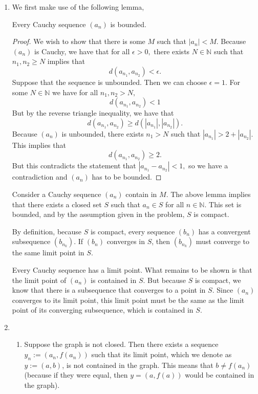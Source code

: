 \documentclass{article}
\numberwithin{equation}{section}
\begin{document}
\begin{enumerate}
\begin{enumerate}[label=(\alph*)]
    \end{enumerate}
    \newpage
    \item We first make use of the following lemma, 
    \begin{lemma}
        Every Cauchy sequence $(a_n)$ is bounded.
        \begin{proof}
            We wish to show that there is some $M$ such that $|a_n|<M.$ Because $(a_n)$ is Cauchy, we have that for all $\epsilon >0,$ there exists $N\in \mathbb{N}$ such that $n_1,n_2 \ge N$ implies that 
            \begin{equation}
                d(a_{n_1},a_{n_2}) <\epsilon.
            \end{equation}
            Suppose that the sequence is unbounded. Then we can choose $\epsilon = 1.$ For some $N \in \mathbb{N}$ we have for all $n_1,n_2 > N,$
            \begin{equation}
                d(a_{n_1},a_{n_2}) < 1
            \end{equation}
            But by the reverse triangle inequality, we have that 
            \begin{equation}
                d(a_{n_1},a_{n_2}) \ge d(|a_{n_1}|,|a_{n_2}|).
            \end{equation}
            Because $(a_n)$ is unbounded, there exists $n_1 > N$ such that $|a_{n_1}| > 2 + |a_{n_2}|.$ This implies that 
            \begin{equation}
                d(a_{n_1}, a_{n_2}) \ge 2.
            \end{equation}
            But this contradicts the statement that $|a_{n_1} - a_{n_2}| < 1,$ so we have a contradiction and $(a_n)$ has to be bounded.
        \end{proof}
    \end{lemma}
    Consider a Cauchy sequence $(a_n)$ contain in $M.$ The above lemma implies that there exists a closed set $S$ such that $a_n \in S$ for all $n \in \mathbb{N}.$ This set is bounded, and by the assumption given in the problem, $S$ is compact.

    By definition, because $S$ is compact, every sequence $(b_n)$ has a convergent subsequence $(b_{n_k})$. If $(b_n)$ converges in  $S$, then $(b_{n_k})$ must converge to the same limit point in $S$.

    Every Cauchy sequence has a limit point. What remains to be shown is that the limit point of $(a_n)$ is contained in $S.$ But because $S$ is compact, we know that there is a subsequence that converges to a point in $S.$ Since $(a_n)$ converges to its limit point, this limit point must be the same as the limit point of its converging subsequence, which is contained in $S.$
    \newpage
    \item \begin{enumerate}[label=(\alph*)]
        \item Suppose the graph is not closed. Then there exists a sequence $y_n := (a_n, f(a_n))$ such that its limit point, which we denote as $y := (a,b)$, is not contained in the graph. This means that $b \neq f(a_n)$ (because if they were equal, then $y=(a,f(a))$ would be contained in the graph).


\end{enumerate}
\end{enumerate}
\end{document}
